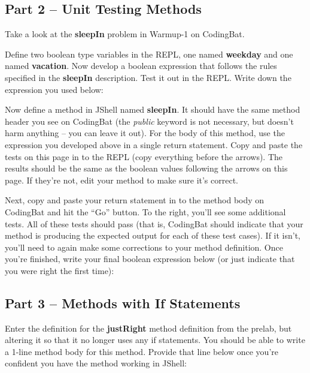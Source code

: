 \initialbox


\subsection{Part 2 -- Unit Testing Methods}

Take a look at the \textbf{sleepIn} problem in Warmup-1 on CodingBat. 

\begin{exer}Define two boolean type variables in the REPL, one named \textbf{weekday} and one named \textbf{vacation}. Now develop a boolean expression that follows the rules specified in the \textbf{sleepIn} description. Test it out in the REPL. Write down the expression you used below:

\evalline

Now define a method in JShell named \textbf{sleepIn}. It should have the same method header you see on CodingBat (the \textit{public} keyword is not necessary, but doesn't harm anything -- you can leave it out). For the body of this method, use the expression you developed above in a single return statement. Copy and paste the tests on this page in to the REPL (copy everything before the arrows). The results should be the same as the boolean values following the arrows on this page. If they're not, edit your method to make sure it's correct. 

Next, copy and paste your return statement in to the method body on CodingBat and hit the ``Go'' button. To the right, you'll see some additional tests. All of these tests should pass (that is, CodingBat should indicate that your method is producing the expected output for each of these test cases). If it isn't, you'll need to again make some corrections to your method definition. Once you're finished, write your final boolean expression below (or just indicate that you were right the first time):

\evalline

\end{exer}

\initialbox


\subsection{Part 3 -- Methods with If Statements}

\begin{exer}
Enter the definition for the \textbf{justRight} method definition from the prelab, but altering it so that it no longer uses any if statements. You should be able to write a 1-line method body for this method. Provide that line below once you're confident you have the method working in JShell:

\evalline
\end{exer}

